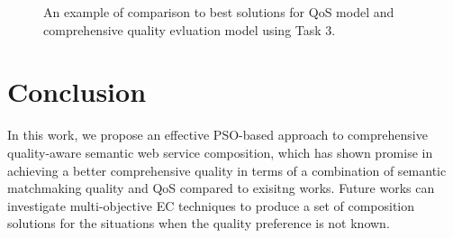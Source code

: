 \documentclass{llncs}
\begin{document}
\begin{figure}[h]
 \caption{An example of comparison to best solutions for QoS model and comprehensive quality evluation model using Task 3.}
 \label{comparisontest}
\end{figure}
\vspace{-1.0cm}

\section{Conclusion}\label{conclusion}

In this work, we propose an effective PSO-based approach to comprehensive quality-aware semantic web service composition, which has shown promise in achieving a better comprehensive quality in terms of a combination of semantic matchmaking quality and QoS compared to exisitng works. Future works can investigate multi-objective EC techniques to produce a set of composition solutions for the situations when the quality preference is not known.

\vspace{-0.3cm}


\end{document}
